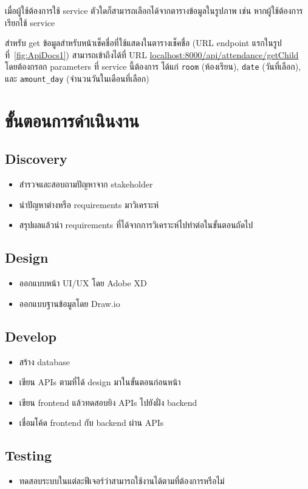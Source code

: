 เมื่อผู้ใช้ต้องการใช้ service ตัวใดก็สามารถเลือกได้จากตารางข้อมูลในรูปภาพ เช่น หากผู้ใช้ต้องการเรียกใช้ service 

สำหรับ get ข้อมูลสำหรับหน้าเช็คชื่อที่ใช้แสดงในตารางเช็คชื่อ (URL endpoint แรกในรูปที่~\ref{fig:ApiDocs1}) 
สามารถเข้าถึงได้ที่ URL \url{localhost:8000/api/attendance/getChild} โดยต้องกรอก parameters ที่ 
service นี้ต้องการ ได้แก่ \texttt{room} (ห้องเรียน), \texttt{date} (วันที่เลือก), และ \texttt{amount\_day} (จำนวนวันในเดือนที่เลือก)

\section{ขั้นตอนการดำเนินงาน}
\subsection{Discovery}
\begin{itemize}
  \item สำรวจและสอบถามปัญหาจาก stakeholder
  \item นำปัญหาต่างหรือ requirements มาวิเคราะห์
  \item สรุปผลแล้วนำ requirements ที่ได้จากการวิเคราะห์ไปทำต่อในขั้นตอนถัดไป
\end{itemize}

\subsection{Design}
\begin{itemize}
  \item ออกแบบหน้า UI/UX โดย Adobe XD
  \item ออกแบบฐานข้อมูลโดย Draw.io
\end{itemize}

\subsection{Develop}
\begin{itemize}
  \item สร้าง database
  \item เขียน APIs ตามที่ได้ design มาในขั้นตอนก่อนหน้า
  \item เขียน frontend แล้วทดสอบยิง APIs ไปยังฝั่ง backend
  \item เชื่อมโค้ด frontend กับ backend ผ่าน APIs
\end{itemize}

\subsection{Testing}
\begin{itemize}
  \item ทดสอบระบบในแต่ละฟีเจอร์ว่าสามารถใช้งานได้ตามที่ต้องการหรือไม่
\end{itemize}


